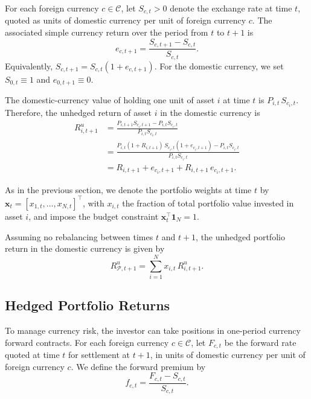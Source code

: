 For each foreign currency $c\in\mathcal{C}$, let $S_{c,t} > 0$ denote the exchange rate at time $t$, quoted as units of domestic currency per unit of foreign currency $c$. The associated simple currency return over the period from $t$ to $t+1$ is
\begin{equation*}
e_{c,t+1} = \frac{S_{c,t+1}-S_{c,t}}{S_{c,t}}.
\end{equation*}
Equivalently, $S_{c,t+1} = S_{c,t}(1+e_{c,t+1})$. For the domestic currency, we set $S_{0,t}\equiv 1$ and $e_{0,t+1}\equiv 0$.

The domestic-currency value of holding one unit of asset $i$ at time $t$ is $P_{i,t}\,S_{c_i,t}$. Therefore, the unhedged return of asset $i$ in the domestic currency is
\begin{align}
R^{u}_{i,t+1}
&=
\frac{P_{i,t+1}S_{c_i,t+1} - P_{i,t}S_{c_i,t}}{P_{i,t}S_{c_i,t}}
\nonumber\\
&=
\frac{P_{i,t}(1+R_{i,t+1})\,S_{c_i,t}(1+e_{c_i,t+1}) - P_{i,t}S_{c_i,t}}{P_{i,t}S_{c_i,t}}
\nonumber\\
&=
R_{i,t+1} + e_{c_i,t+1} + R_{i,t+1}\,e_{c_i,t+1}.
\label{eq:unhedged-asset-return}
\end{align}

As in the previous section, we denote the portfolio weights at time $t$ by $\bm{x}_t = [x_{1,t}, \dots, x_{N,t}]^\top$, with $x_{i,t}$ the fraction of total portfolio value invested in asset $i$,
and impose the budget constraint $\bm{x}_t^\top \bm{1}_N = 1$.

Assuming no rebalancing between times $t$ and $t+1$, the unhedged portfolio return in the domestic currency is given by
\begin{equation*}
R^{u}_{\mathcal{P},t+1} = \sum_{i=1}^N x_{i,t}\,R^{u}_{i,t+1}.
\end{equation*}

\subsection{Hedged Portfolio Returns}\label{sec:hedged-returns}

To manage currency risk, the investor can take positions in one-period currency forward contracts. For each foreign currency $c\in\mathcal{C}$, let $F_{c,t}$ be the forward rate quoted at time $t$ for settlement at $t+1$, in units of domestic currency per unit of foreign currency $c$. We define the forward premium by
\begin{equation*}
f_{c,t} = \frac{F_{c,t}-S_{c,t}}{S_{c,t}}.
\end{equation*}

